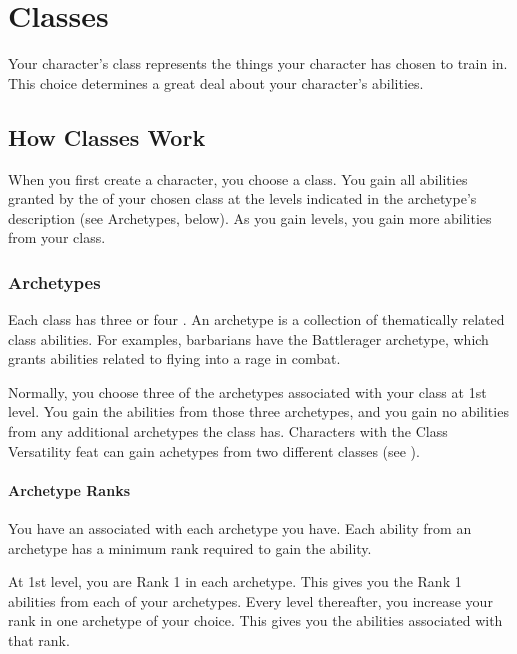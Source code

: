 \chapter{Classes}\label{Classes}

Your character's class represents the things your character has chosen to train in.
This choice determines a great deal about your character's abilities.

\section{How Classes Work}
    When you first create a character, you choose a class.
    You gain all abilities granted by the  of your chosen class at the levels indicated in the archetype's description (see Archetypes, below).
    As you gain levels, you gain more abilities from your class.

    \subsection{Archetypes}\label{Archetypes}
        Each class has three or four .
        An archetype is a collection of thematically related class abilities.
        For examples, barbarians have the Battlerager archetype, which grants abilities related to flying into a rage in combat.

        Normally, you choose three of the archetypes associated with your class at 1st level.
        You gain the abilities from those three archetypes, and you gain no abilities from any additional archetypes the class has.
        Characters with the Class Versatility feat can gain achetypes from two different classes (see ).

        \subsubsection{Archetype Ranks}\label{Archetype Ranks}
            You have an  associated with each archetype you have.
            Each ability from an archetype has a minimum rank required to gain the ability.

            At 1st level, you are Rank 1 in each archetype.
            This gives you the Rank 1 abilities from each of your archetypes.
            Every level thereafter, you increase your rank in one archetype of your choice.
            This gives you the abilities associated with that rank.

